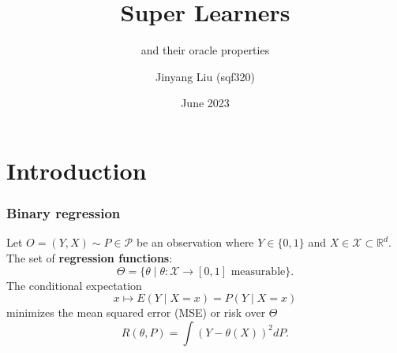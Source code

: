 \documentclass{beamer}
\title{Super Learners}
\subtitle{and their oracle properties}
\author[Jinyang Liu (sqf320)]{Jinyang Liu (sqf320)}
\institute[UCPH] %
{
  Department of Mathematical Sciences\\
  University of Copenhagen
}
\date[VLC 2023]{June 2023}
\newcommand{\btheta}{\theta}
\begin{document}
\frame{\titlepage}
\section{Introduction}
\begin{frame}
    \frametitle{Binary regression}
    Let $ O = (Y, X) \sim P\in\mathcal P $ be an observation where $ Y \in \{0,1\} $ and $ X \in\mathcal X
    \subset\mathbb{R}^{d} $.
    \vfill
    The set of \textbf{regression functions}: $$ \Theta = \{\btheta \mid \btheta : \mathcal{X} \to [0,1] \text{ measurable}\}.$$
    \vfill
    The conditional expectation $$ x \mapsto E(Y \mid X = x) = P(Y \mid X = x) $$ minimizes the  mean squared error (MSE) or risk over \(\Theta\)
        $$
            R(\btheta , P) = \int (Y - \theta(X))^2 d P.
        $$
      \end{frame}

%
\end{document}
